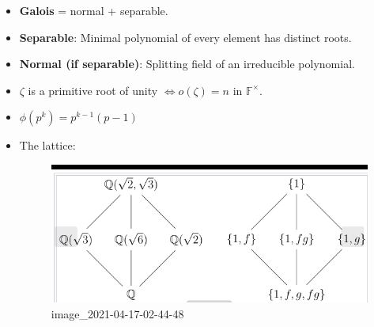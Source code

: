 \begin{concept}

\envlist

\begin{itemize}
\item
  \textbf{Galois} = normal + separable.
\item
  \textbf{Separable}: Minimal polynomial of every element has distinct
  roots.
\item
  \textbf{Normal (if separable)}: Splitting field of an irreducible
  polynomial.
\item
  \(\zeta\) is a primitive root of unity \(\iff o(\zeta) = n\) in
  \({\mathbb{F}}^{\times}\).
\item
  \(\phi(p^k) = p^{k-1}(p-1)\)
\item
  The lattice:

  \begin{figure}
  \centering
  \includegraphics{figures/image_2021-04-17-02-44-48.png}
  \caption{image\_2021-04-17-02-44-48}
  \end{figure}
\end{itemize}

\end{concept}


